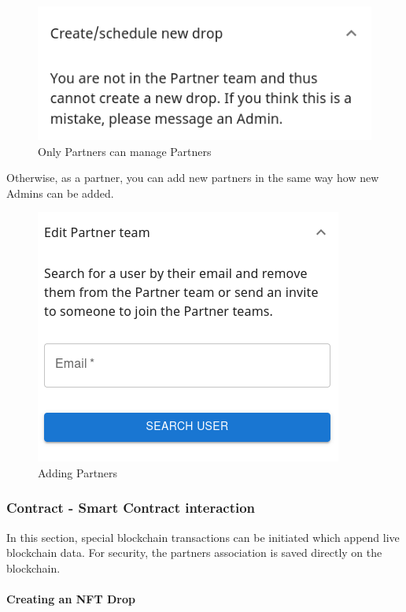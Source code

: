 \documentclass[
]{article}
\begin{document}
\begin{figure}
\centering
\includegraphics{images/admins_arent_partners.png}
\caption{Only Partners can manage Partners}
\end{figure}\newpage

Otherwise, as a partner, you can add new partners in the same way how
new Admins can be added.

\begin{figure}
\centering
\includegraphics{images/add_partners.png}
\caption{Adding Partners}
\end{figure}\newpage

\hypertarget{contract---smart-contract-interaction}{%
\subsubsection{Contract - Smart Contract
interaction}\label{contract---smart-contract-interaction}}

In this section, special blockchain transactions can be initiated which
append live blockchain data. For security, the partners association is
saved directly on the blockchain.

\hypertarget{creating-an-nft-drop}{%
\paragraph{Creating an NFT Drop}\label{creating-an-nft-drop}}
\end{document}
